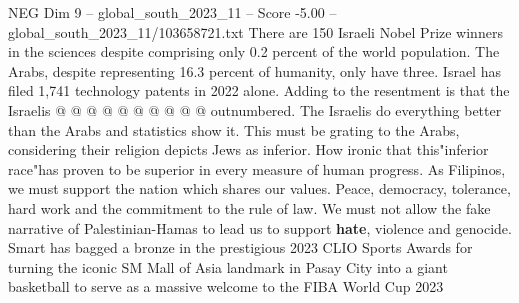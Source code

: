 \begin{textsample}{NEG Dim 9 – global\_south\_2023\_11 – Score -5.00 – global\_south\_2023\_11/103658721.txt}
There are 150 Israeli Nobel Prize winners in the sciences despite comprising only 0.2 percent of the world population.
The Arabs, despite representing 16.3 percent of humanity, only have three.
Israel has filed 1,741 technology patents in 2022 alone.
Adding to the resentment is that the Israelis @ @ @ @ @ @ @ @ @ @ outnumbered.
The Israelis do everything better than the Arabs and statistics show it.
This must be grating to the Arabs, considering their religion depicts Jews as inferior.
How ironic that this"inferior race"has proven to be superior in every measure of human progress.
As Filipinos, we must support the nation which shares our values.
Peace, democracy, tolerance, hard work and the commitment to the rule of law.
We must not allow the fake narrative of Palestinian-Hamas to lead us to support \textbf{hate}, violence and genocide.
Smart has bagged a bronze in the prestigious 2023 CLIO Sports Awards for turning the iconic SM Mall of Asia landmark in Pasay City into a giant basketball to serve as a massive welcome to the FIBA World Cup 2023

\end{textsample}

